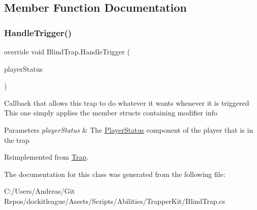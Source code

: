 \subsection{Member Function Documentation}
\hypertarget{class_blind_trap_ac4e3be7b712921ae6510aca3be3ef428}{}\label{class_blind_trap_ac4e3be7b712921ae6510aca3be3ef428} 
\subsubsection{\texorpdfstring{Handle\+Trigger()}{HandleTrigger()}}
{\footnotesize\ttfamily override void Blind\+Trap.\+Handle\+Trigger (\begin{DoxyParamCaption}\item[{\hyperlink{class_player_status}{Player\+Status}}]{player\+Status }\end{DoxyParamCaption})\hspace{0.3cm}{\ttfamily [virtual]}}



Callback that allows this trap to do whatever it wants whenever it is triggered This one simply applies the member structs containing modifier info 


\begin{DoxyParams}{Parameters}
{\em player\+Status} & The \hyperlink{class_player_status}{Player\+Status} component of the player that is in the trap\\
\hline
\end{DoxyParams}


Reimplemented from \hyperlink{class_trap_a2e92a6f420a5d21a132108d8dd3ca5de}{Trap}.



The documentation for this class was generated from the following file\+:\begin{DoxyCompactItemize}
\item 
C\+:/\+Users/\+Andreas/\+Git Repos/dockitleague/\+Assets/\+Scripts/\+Abilities/\+Trapper\+Kit/Blind\+Trap.\+cs\end{DoxyCompactItemize}
